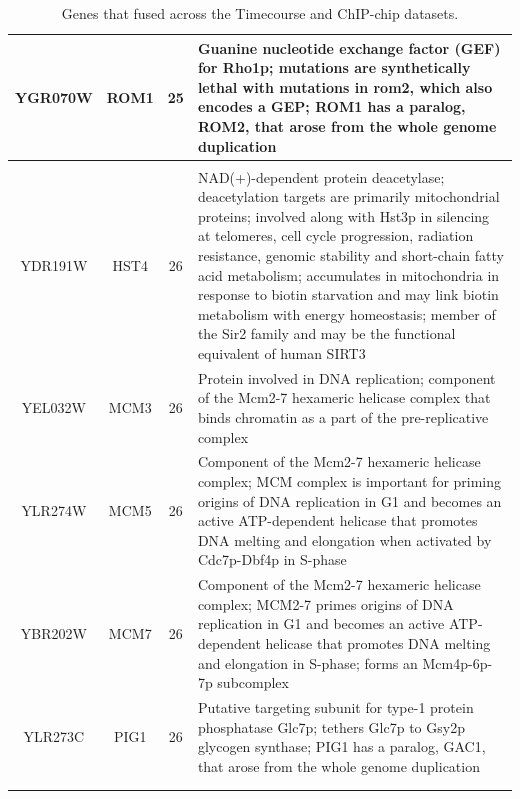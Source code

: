 \documentclass[]{article}
\begin{document}
\begin{longtable}{@{\extracolsep{3pt}} cccp{85mm}}
YGR070W & ROM1 & 25 & Guanine nucleotide exchange factor (GEF) for Rho1p; mutations are synthetically lethal with mutations in rom2, which also encodes a GEP; ROM1 has a paralog, ROM2, that arose from the whole genome duplication \\   \hline \\ [-1.8ex] 
YDR191W & HST4 & 26 & NAD(+)-dependent protein deacetylase; deacetylation targets are primarily mitochondrial proteins; involved along with Hst3p in silencing at telomeres, cell cycle progression, radiation resistance, genomic stability and short-chain fatty acid metabolism; accumulates in mitochondria in response to biotin starvation and may link biotin metabolism with energy homeostasis; member of the Sir2 family and may be the functional equivalent of human SIRT3 \\ 
YEL032W & MCM3 & 26 & Protein involved in DNA replication; component of the Mcm2-7 hexameric helicase complex that binds chromatin as a part of the pre-replicative complex \\ 
YLR274W & MCM5 & 26 & Component of the Mcm2-7 hexameric helicase complex; MCM complex is important for priming origins of DNA replication in G1 and becomes an active ATP-dependent helicase that promotes DNA melting and elongation when activated by Cdc7p-Dbf4p in S-phase \\ 
YBR202W & MCM7 & 26 & Component of the Mcm2-7 hexameric helicase complex; MCM2-7 primes origins of DNA replication in G1 and becomes an active ATP-dependent helicase that promotes DNA melting and elongation in S-phase; forms an Mcm4p-6p-7p subcomplex \\ 
YLR273C & PIG1 & 26 & Putative targeting subunit for type-1 protein phosphatase Glc7p; tethers Glc7p to Gsy2p glycogen synthase; PIG1 has a paralog, GAC1, that arose from the whole genome duplication \\ 
\hline \\[-1.8ex] 
\caption{Genes that fused across the Timecourse and ChIP-chip datasets.}
\label{tab:timecoursChIPchipFused}
\end{longtable} 
\end{document}
